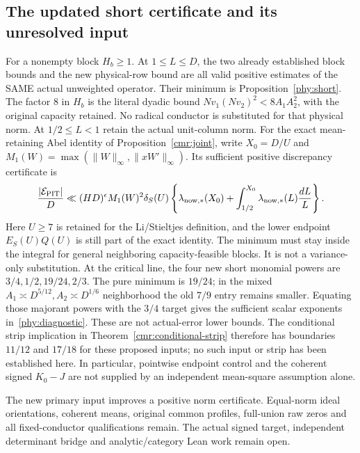 \documentclass[11pt]{article}
\theoremstyle{definition}\newtheorem{definition}[theorem]{Definition}
\theoremstyle{remark}\newtheorem{remark}[theorem]{Remark}
\begin{document}
\subsection{The updated short certificate and its unresolved input}\label{phy:short-proof}
For a nonempty block $H_b\ge1$. At $1\le L\le D$, the two already established block bounds and the new
physical-row bound are all valid positive estimates of the SAME actual
unweighted operator. Their minimum is Proposition~\ref{phy:short}.
The factor $8$ in $H_b$ is the literal dyadic bound
$Nv_1(Nv_2)^2<8A_1A_2^2$, with the original capacity retained.
No radical conductor is substituted for that physical norm.
At $1/2\le L<1$ retain the actual unit-column norm.
For the exact mean-retaining Abel identity of Proposition~\ref{cmr:joint},
write $X_0=D/U$ and $M_1(W)=\max(\|W\|_\infty,\|xW'\|_\infty)$.
Its sufficient positive discrepancy certificate is
\[
 \frac{|\mathcal E_{\rm PIT}|}{D}
 \ll (HD)^\epsilon M_1(W)^2\delta_S(U)
 \left\{\lambda_{{\rm now},*}(X_0)
       +\int_{1/2}^{X_0}\lambda_{{\rm now},*}(L)\frac{dL}{L}\right\}.
\]
Here $U\ge7$ is retained for the Li/Stieltjes definition, and the lower
endpoint $E_S(U)Q(U)$ is still part of the exact identity.
The minimum must stay inside the integral for general neighboring
capacity-feasible blocks. It is not a variance-only substitution.
At the critical line, the four new short monomial powers are
$3/4,1/2,19/24,2/3$. The pure minimum is $19/24$; in the mixed
$A_1\asymp D^{5/12},A_2\asymp D^{1/6}$ neighborhood the old $7/9$
entry remains smaller. Equating those majorant powers with the $3/4$
target gives the sufficient scalar exponents in~\eqref{phy:diagnostic}.
These are not actual-error lower bounds.
The conditional strip implication in Theorem~\ref{cmr:conditional-strip}
therefore has boundaries $11/12$ and $17/18$ for these proposed inputs;
no such input or strip has been established here. In particular,
pointwise endpoint control and the coherent signed $K_0-J$ are not
supplied by an independent mean-square assumption alone.

The new primary input improves a positive norm certificate. Equal-norm
ideal orientations, coherent means, original common profiles, full-union
raw zeros and all fixed-conductor qualifications remain. The actual
signed target, independent determinant bridge and analytic/category
Lean work remain open.
\end{document}
